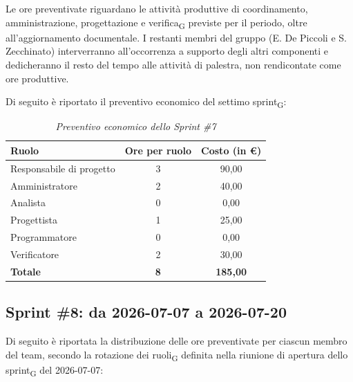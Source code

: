 ﻿\documentclass[a4paper, 10pt, colorlinks=true, linkcolor=black, urlcolor=blue, citecolor=blue, hidelinks]{article}
\renewcommand{\arraystretch}{1.2}
\begin{document}
Le ore preventivate riguardano le attività produttive di coordinamento, amministrazione, progettazione e verifica\textsubscript{G} previste per il periodo, oltre all'aggiornamento documentale. I restanti membri del gruppo (E. De Piccoli e S. Zecchinato) interverranno all'occorrenza a supporto degli altri componenti e dedicheranno il resto del tempo alle attività di palestra, non rendicontate come ore produttive.

Di seguito è riportato il preventivo economico del settimo sprint\textsubscript{G}:

\begin{table}[H]
    \centering
    \renewcommand{\arraystretch}{1.4}
    \begin{tabular}{|l|c|c|}
        \hline
        \rowcolor{bluBitless!15}
        \textbf{Ruolo} & \textbf{Ore per ruolo} & \textbf{Costo (in €)} \\
        \hline
        Responsabile di progetto & 3 & 90,00 \\ \hline
        Amministratore & 2 & 40,00 \\ \hline
        Analista & 0 & 0,00 \\ \hline
        Progettista & 1 & 25,00 \\ \hline
        Programmatore & 0 & 0,00 \\ \hline
        Verificatore & 2 & 30,00 \\ \hline
        \rowcolor{bluBitless!8}
        \textbf{Totale} & \textbf{8} & \textbf{185,00} \\ \hline
    \end{tabular}
    \caption{\textit{Preventivo economico dello Sprint \#7}}
\end{table}

\subsection{Sprint \#8: da 2026-07-07 a 2026-07-20}
Di seguito è riportata la distribuzione delle ore preventivate per ciascun membro del team, secondo la rotazione dei ruoli\textsubscript{G} definita nella riunione di apertura dello sprint\textsubscript{G} del 2026-07-07:
\end{document}
